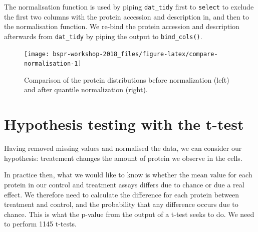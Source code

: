 \documentclass[12pt,]{book}
\newenvironment{Shaded}{\begin{snugshade}}{\end{snugshade}}
\newcommand{\DecValTok}[1]{\textcolor[rgb]{0.00,0.00,0.81}{#1}}
\newcommand{\KeywordTok}[1]{\textcolor[rgb]{0.13,0.29,0.53}{\textbf{#1}}}
\newcommand{\NormalTok}[1]{#1}
\newcommand{\OperatorTok}[1]{\textcolor[rgb]{0.81,0.36,0.00}{\textbf{#1}}}
\newcommand{\StringTok}[1]{\textcolor[rgb]{0.31,0.60,0.02}{#1}}
\begin{document}
The normalisation function is used by piping \texttt{dat\_tidy} first to \texttt{select} to
exclude the first two columns with the protein accession and description in, and
then to the normalisation function. We re-bind the protein accession and description afterwards from \texttt{dat\_tidy} by piping the output to \texttt{bind\_cols()}.

\begin{Shaded}
\end{Shaded}




\begin{figure}

{\centering \texttt{[image: bspr-workshop-2018\_files/figure-latex/compare-normalisation-1]} 

}

\caption{Comparison of the protein distributions before normalization (left)
and after quantile normalization (right).}\label{fig:compare-normalisation}
\end{figure}

\hypertarget{hypothesis-testing-with-the-t-test}{%
\section{Hypothesis testing with the t-test}\label{hypothesis-testing-with-the-t-test}}

Having removed missing values and normalised the data, we can consider our
hypothesis: treatement changes the amount of protein we observe in the cells.

In practice then, what we would like to know is whether the mean value for each
protein in our control and treatment assays differs due to chance or due a
real effect. We therefore need to calculate the difference for each protein
between treatment and control, and the probability that any difference occurs
due to chance. This is what the p-value from the output of a
t-test seeks to do. We need to perform 1145 t-tests.
\end{document}
